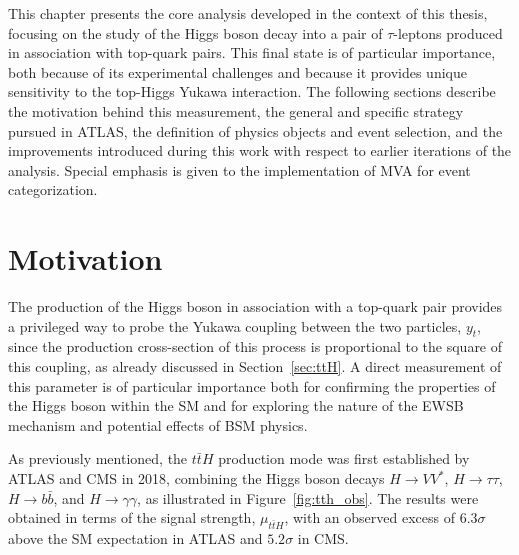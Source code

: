 \newcommand*{\pth}{$p^{H}_{\text{T}}$\xspace}
\newcommand*{\htautau}{$H \to \tau \tau$\xspace}
\newcommand*{\ztautau}{$Z \to \tau \tau$\xspace}
\newcommand*{\pt}{$p_{\text{T}}$\xspace}
\newcommand*{\taul}{$\tau$-lepton\xspace}
\newcommand*{\tauhadvis}{\ensuremath{\tauhad}\xspace}
\newcommand*{\mmc}{\ensuremath{m^\text{MMC}_{\tau\tau}}\xspace}
\newcommand*{\taulephad}{$\tau_{\text{lep}}\tau_{\text{had}}$\xspace}
\newcommand*{\tauhadhad}{$\tau_{\text{had}}\tau_{\text{had}}$\xspace}
\newcommand*{\tauemu}{$\tau_{e}\tau_{\mu}$\xspace}
\newcommand*{\mtt}{\ensuremath{m_{\tau\tau}}\xspace}


This chapter presents the core analysis developed in the context of this thesis, focusing on the study of the Higgs boson decay into a pair of $\tau$-leptons produced in association with top-quark pairs. This \ttHtt final state is of particular importance, both because of its experimental challenges and because it provides unique sensitivity to the top-Higgs Yukawa interaction. The following sections describe the motivation behind this measurement, the general and specific strategy pursued in ATLAS, the definition of physics objects and event selection, and the improvements introduced during this work with respect to earlier iterations of the analysis. Special emphasis is given to the implementation of MVA for event categorization.


\section{Motivation}
\label{sec:analysis_motivation}

The production of the Higgs boson in association with a top-quark pair provides a privileged way to probe the Yukawa coupling between the two particles, $y_{t}$, since the production cross-section of this process is proportional to the square of this coupling, as already discussed in Section~\ref{sec:ttH}. A direct measurement of this parameter is of particular importance both for confirming the properties of the Higgs boson within the SM and for exploring the nature of the EWSB mechanism and potential effects of BSM physics.

As previously mentioned, the $t\bar{t}H$ production mode was first established by ATLAS and CMS in 2018, combining the Higgs boson decays $H \to VV^{*}$, $H \to \tau\tau$, $H \to b\bar{b}$, and $H \to \gamma\gamma$, as illustrated in Figure~\ref{fig:tth_obs}. The results were obtained in terms of the signal strength, $\mu_{t\bar{t}H}$, with an observed excess of $6.3\sigma$ above the SM expectation in ATLAS and $5.2\sigma$ in CMS.

